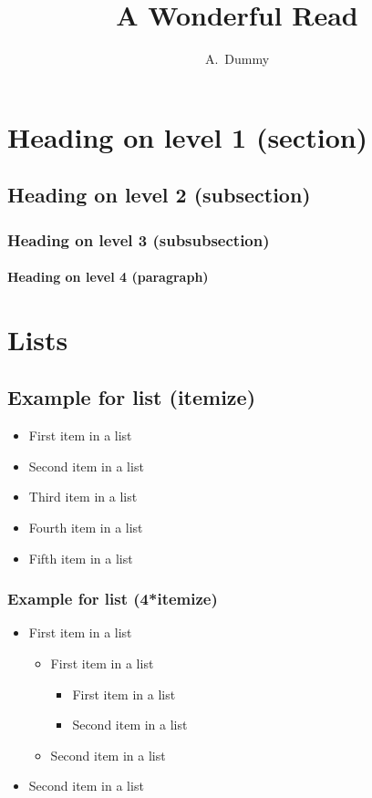 \documentclass[a4paper,12pt]{llncs}
\author{A.~Dummy}
\title{A Wonderful Read}
\begin{document}
\maketitle

\begin{abstract}
\blindtext
\end{abstract}

\section{Heading on level 1 (section)}
\blindtext

\subsection{Heading on level 2 (subsection)}
\blindtext

\subsubsection{Heading on level 3 (subsubsection)}
\blindtext

\paragraph{Heading on level 4 (paragraph)}
\blindtext

\section{Lists}
\subsection{Example for list (itemize)}
\begin{itemize}
\item First item in a list
\item Second item in a list
\item Third item in a list
\item Fourth item in a list
\item Fifth item in a list
\end{itemize}

\subsubsection{Example for list (4*itemize)}
\begin{itemize}
\item First item in a list
	\begin{itemize}
	\item First item in a list
		\begin{itemize}
		\item First item in a list
		\item Second item in a list
		\end{itemize}
	\item Second item in a list
	\end{itemize}
\item Second item in a list
\end{itemize}
\end{document}
